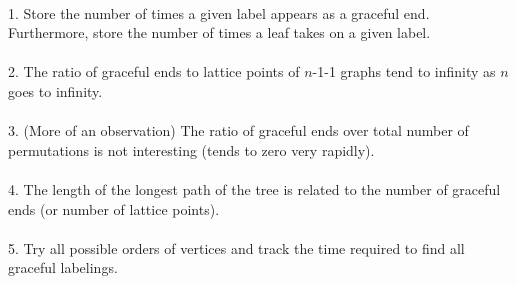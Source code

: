 \documentclass{article}
\begin{document}
\paragraph{}1. Store the number of times a given label appears as a graceful
end. Furthermore, store the number of times a leaf takes on a given label.
\paragraph{}2. The ratio of graceful ends to lattice points of $n$-1-1 graphs tend
to infinity as $n$ goes to infinity.
\paragraph{}3. (More of an observation) The ratio of graceful ends over total
number of permutations is not interesting (tends to zero very rapidly).
\paragraph{}4. The length of the longest path of the tree is related to the
number of graceful ends (or number of lattice points).
\paragraph{}5. Try all possible orders of vertices and track the time required
to find all graceful labelings.
\end{document}
